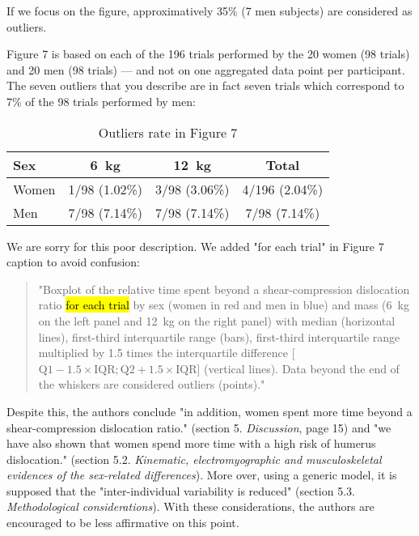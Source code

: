 \documentclass[preprint,review,12pt]{elsarticle}
\begin{document}
    \begin{formal}
        If we focus on the figure, approximatively 35\% (7 men subjects) are considered as outliers.
    \end{formal}

    Figure 7 is based on each of the 196 trials performed by the 20 women (98 trials) and 20 men (98 trials) --- and not on one aggregated data point per participant.
    The seven outliers that you describe are in fact seven trials which correspond to 7\% of the 98 trials performed by men:

    \begin{table}[H]
        \centering
        \caption{Outliers rate in Figure 7}
        \begin{tabular}{lccc}
            \hline
            Sex & 6~kg & 12~kg & Total         \\ \hline
            Women & 1/98 (1.02\%) & 3/98 (3.06\%) & 4/196 (2.04\%) \\
            Men & 7/98 (7.14\%) & 7/98 (7.14\%) & 7/98 (7.14\%) \\ \hline
        \end{tabular}
    \end{table}

    We are sorry for this poor description.
    We added "for each trial" in Figure 7 caption to avoid confusion:

    \begin{quote}
        "Boxplot of the relative time spent beyond a shear-compression dislocation ratio \hl{for each trial} by sex (women in red and men in blue) and mass (6~kg on the left panel and 12~kg on the right panel) with median (horizontal lines), first-third interquartile range (bars), first-third interquartile range multiplied by 1.5 times the interquartile difference [$\textrm{Q1} - 1.5 \times \textrm{IQR}; \textrm{Q2} + 1.5 \times \textrm{IQR}$] (vertical lines).
        Data beyond the end of the whiskers are considered outliers (points)."
    \end{quote}

    \begin{formal}
        Despite this, the authors conclude "in addition, women spent more time beyond a shear-compression dislocation ratio." (section 5. \textit{Discussion}, page 15) and "we have also shown that women spend more time with a high risk of humerus dislocation." (section 5.2. \textit{Kinematic, electromyographic and musculoskeletal evidences of the sex-related differences}).
        More over, using a generic model, it is supposed that the "inter-individual variability is reduced" (section 5.3. \textit{Methodological considerations}).
        With these considerations, the authors are encouraged to be less affirmative on this point.
    \end{formal}
\end{document}
